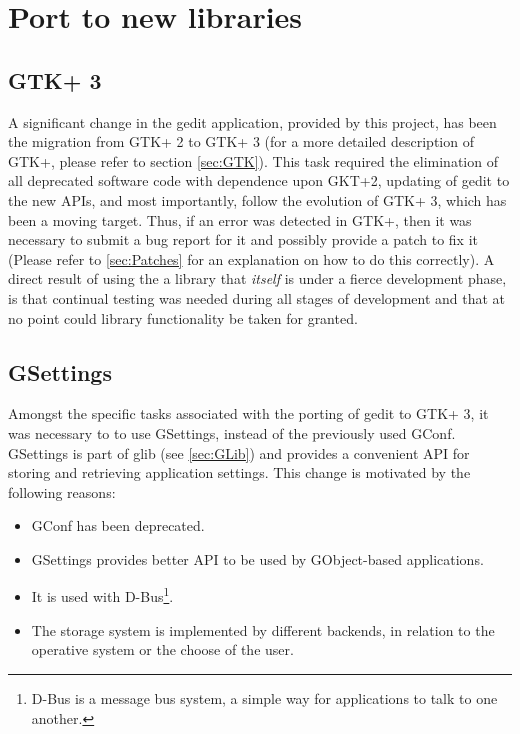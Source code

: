 
\section{Port to new libraries}\label{sec:NewLibraries}

\subsection{GTK+ 3}\label{sec:GTK3}

A significant change in the gedit application, provided by this project, has been the migration from GTK+ 2 to GTK+ 3 
(for a more detailed description of GTK+, please refer to section \ref{sec:GTK}).
This task required the elimination of all deprecated software code with dependence upon GKT+2, updating of gedit to the 
new APIs, and most importantly, follow the evolution of GTK+ 3, which has been a moving target.  Thus, if an error was 
detected in GTK+, then it was necessary to submit a bug report for it and possibly provide a patch to fix it (Please 
refer to \ref{sec:Patches} for an explanation on how to do this correctly).  A direct result of using the a library 
that \textit{itself} is under a fierce development phase, is that continual testing was needed during all stages of 
development and that at no point could library functionality be taken for granted.


\subsection[GSettings]{GSettings\cite{website:gio}}\label{sec:GSettings}

Amongst the specific tasks associated with the porting of gedit to GTK+ 3, it was necessary 
to to use GSettings, instead of the previously used GConf.  GSettings is part of glib (see \ref{sec:GLib}) 
and provides a convenient API for storing and retrieving application settings.   This 
change is motivated by the following reasons: 
\begin{itemize}
  \item GConf has been deprecated.
  \item GSettings provides better API to be used by GObject-based applications.
  \item It is used with D-Bus\footnote{D-Bus is a message bus system, a simple way for applications to talk to one another.}.
  \item The storage system is implemented by different backends, in relation to the operative system or the choose of the user.
\end{itemize}


